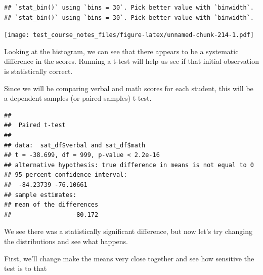 \documentclass[
]{book}
\newenvironment{Shaded}{\begin{snugshade}}{\end{snugshade}}
\newcommand{\AttributeTok}[1]{\textcolor[rgb]{0.77,0.63,0.00}{#1}}
\newcommand{\CommentTok}[1]{\textcolor[rgb]{0.56,0.35,0.01}{\textit{#1}}}
\newcommand{\ConstantTok}[1]{\textcolor[rgb]{0.00,0.00,0.00}{#1}}
\newcommand{\FunctionTok}[1]{\textcolor[rgb]{0.00,0.00,0.00}{#1}}
\newcommand{\NormalTok}[1]{#1}
\newcommand{\OtherTok}[1]{\textcolor[rgb]{0.56,0.35,0.01}{#1}}
\newcommand{\SpecialCharTok}[1]{\textcolor[rgb]{0.00,0.00,0.00}{#1}}
\begin{document}
\begin{verbatim}
## `stat_bin()` using `bins = 30`. Pick better value with `binwidth`.
## `stat_bin()` using `bins = 30`. Pick better value with `binwidth`.
\end{verbatim}

\texttt{[image: test\_course\_notes\_files/figure-latex/unnamed-chunk-214-1.pdf]}

Looking at the histogram, we can see that there appears to be a systematic difference in the scores. Running a t-test will help us see if that initial observation is statistically correct.

Since we will be comparing verbal and math scores for each student, this will be a dependent samples (or paired samples) t-test.

\begin{Shaded}
\end{Shaded}

\begin{verbatim}
## 
##  Paired t-test
## 
## data:  sat_df$verbal and sat_df$math
## t = -38.699, df = 999, p-value < 2.2e-16
## alternative hypothesis: true difference in means is not equal to 0
## 95 percent confidence interval:
##  -84.23739 -76.10661
## sample estimates:
## mean of the differences 
##                 -80.172
\end{verbatim}

We see there was a statistically significant difference, but now let's try changing the distributions and see what happens.

First, we'll change make the means very close together and see how sensitive the test is to that
\end{document}
